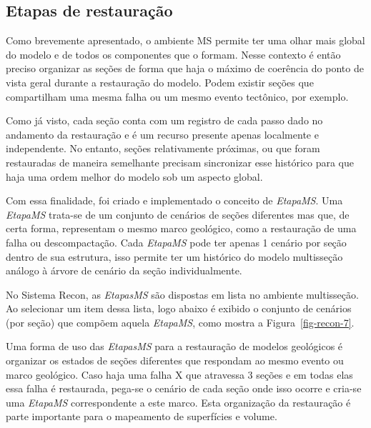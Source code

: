 \subsection{Etapas de restauração}

Como brevemente apresentado, o ambiente MS permite ter uma olhar mais global do modelo e de todos os componentes que o formam. Nesse contexto é então preciso organizar as seções de forma que haja o máximo de coerência do ponto de vista geral durante a restauração do modelo. Podem existir seções que compartilham uma mesma falha ou um mesmo evento tectônico, por exemplo.

Como já visto, cada seção conta com um registro de cada passo dado no andamento da restauração e é um recurso presente apenas localmente e independente. No entanto, seções relativamente próximas, ou que foram restauradas de maneira semelhante precisam sincronizar esse histórico para que haja uma ordem melhor do modelo sob um aspecto global.

Com essa finalidade, foi criado e implementado o conceito de \textit{EtapaMS}. Uma \textit{EtapaMS} trata-se de um conjunto de cenários de seções diferentes mas que, de certa forma, representam o mesmo marco geológico, como a restauração de uma falha ou descompactação. Cada \textit{EtapaMS} pode ter apenas 1 cenário por seção dentro de sua estrutura, isso permite ter um histórico do modelo multisseção análogo à árvore de cenário da seção individualmente.

No Sistema Recon, as \textit{EtapasMS} são dispostas em lista no ambiente multisseção. Ao selecionar um item dessa lista, logo abaixo é exibido o conjunto de cenários (por seção) que compõem aquela \textit{EtapaMS}, como mostra a Figura~\ref{fig-recon-7}.

Uma forma de uso das \textit{EtapasMS} para a restauração de modelos geológicos é organizar os estados de seções diferentes que respondam ao mesmo evento ou marco geológico. Caso haja uma falha X que atravessa 3 seções e em todas elas essa falha é restaurada, pega-se o cenário de cada seção onde isso ocorre e cria-se uma \textit{EtapaMS} correspondente a este marco. Esta organização da restauração é parte importante para o mapeamento de superfícies e volume.


